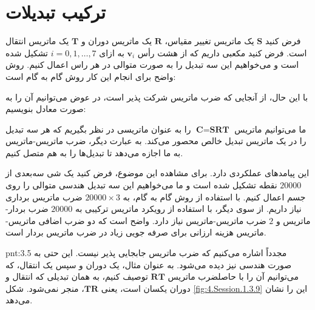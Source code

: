\section{\textbf{ترکیب تبدیلات}}
\label{sec:3.3}
{
    \Large
    \begin{spacing}{1.5}
        فرض کنید $\textbf{S}$ یک ماتریس تغییر مقیاس، $\textbf{R}$ یک ماتریس دوران و $\textbf{T}$ یک ماتریس انتقال است.
        فرض کنید مکعبی داریم که از هشت رأس $\textbf{v}_{i}$ به ازای $i=0,1,\dots,7$ تشکیل شده است و
        می‌خواهیم این سه تبدیل را به صورت متوالی در هر راس اعمال کنیم. روش واضح برای انجام این کار روش گام به گام است:

        \begin{center}
        \end{center}

        با این حال، از آنجایی که ضرب ماتریس شرکت پذیر است، در عوض می‌توانیم آن را به صورت معادل بنویسیم:

        \begin{center}
        \end{center}

        ما می‌توانیم ماتریس $\textbf{C}=\textbf{SRT}$ را به عنوان ماتریسی در نظر بگیریم که هر سه تبدیل را در یک ماتریس تبدیل خالص محصور می‌کند.
        به عبارت دیگر، ضرب ماتریس-ماتریس به ما اجازه می‌دهد تا تبدیل‌ها را به هم متصل کنیم.

        این پیامدهای عملکردی دارد. برای مشاهده این موضوع، فرض کنید یک شی سه‌بعدی از $20000$ نقطه تشکیل شده است و ما می‌خواهیم این سه تبدیل هندسی متوالی را روی جسم اعمال کنیم.
        با استفاده از روش گام به گام، به $20000\times 3$ ضرب ماتریس برداری نیاز داریم.
        از سوی دیگر، با استفاده از رویکرد ماتریس ترکیبی به $20000$ ضرب بردار-ماتریس و $2$ ضرب ماتریس-ماتریس نیاز دارد. واضح است که دو ضرب اضافی ماتریس-ماتریس هزینه ارزانی برای صرفه جویی زیاد در ضرب ماتریس بردار است.

        \begin{point}{pnt:3.5}
            \Large
            مجدداً اشاره می‌کنیم که ضرب ماتریس جابجایی پذیر نیست. این حتی به صورت هندسی نیز دیده می‌شود.
            به عنوان مثال، یک دوران و سپس یک انتقال، که می‌توانیم آن را با حاصلضرب ماتریس $\textbf{RT}$ توصیف کنیم، به همان تبدیلی که انتقال و دوران یکسان است، یعنی $\textbf{TR}$، منجر نمی‌شود. شکل \ref{fig:4.Session.1.3.9} این را نشان می‌دهد.
        \end{point}


\end{spacing}}
